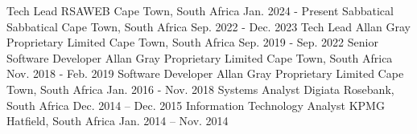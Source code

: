  \begin{cventries}
    \cventry
      {Tech Lead} %
      {RSAWEB} %
      {Cape Town, South Africa} %
      {Jan. 2024 - Present} %
      {}
    \cventry
      {Sabbatical} %
      {Sabbatical} %
      {Cape Town, South Africa} %
      {Sep. 2022 - Dec. 2023} %
      {}
    \cventry
      {Tech Lead} %
      {Allan Gray Proprietary Limited} %
      {Cape Town, South Africa} %
      {Sep. 2019 - Sep. 2022} %
      {}
    \cventry
      {Senior Software Developer} %
      {Allan Gray Proprietary Limited} %
      {Cape Town, South Africa} %
      {Nov. 2018 - Feb. 2019} %
      {}
    \cventry
      {Software Developer} %
      {Allan Gray Proprietary Limited} %
      {Cape Town, South Africa} %
      {Jan. 2016 - Nov. 2018} %
      {}
    \cventry
      {Systems Analyst} %
      {Digiata} %
      {Rosebank, South Africa} %
      {Dec. 2014 – Dec. 2015}%
      {}
    \cventry
      {Information Technology Analyst} %
      {KPMG} %
      {Hatfield, South Africa} %
      {Jan. 2014 – Nov. 2014} %
      {}
  \end{cventries}